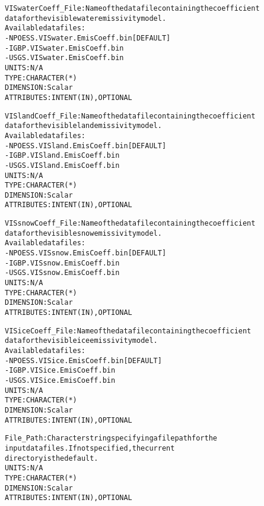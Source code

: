 \begin{alltt}
        VISwaterCoeff_File: Name of the data file containing the coefficient
                            data for the visible water emissivity model.
                            Available datafiles:
                            - NPOESS.VISwater.EmisCoeff.bin  [DEFAULT]
                            - IGBP.VISwater.EmisCoeff.bin
                            - USGS.VISwater.EmisCoeff.bin
                            UNITS:      N/A
                            TYPE:       CHARACTER(*)
                            DIMENSION:  Scalar
                            ATTRIBUTES: INTENT(IN), OPTIONAL
 
        VISlandCoeff_File:  Name of the data file containing the coefficient
                            data for the visible land emissivity model.
                            Available datafiles:
                            - NPOESS.VISland.EmisCoeff.bin  [DEFAULT]
                            - IGBP.VISland.EmisCoeff.bin
                            - USGS.VISland.EmisCoeff.bin
                            UNITS:      N/A
                            TYPE:       CHARACTER(*)
                            DIMENSION:  Scalar
                            ATTRIBUTES: INTENT(IN), OPTIONAL
 
        VISsnowCoeff_File:  Name of the data file containing the coefficient
                            data for the visible snow emissivity model.
                            Available datafiles:
                            - NPOESS.VISsnow.EmisCoeff.bin  [DEFAULT]
                            - IGBP.VISsnow.EmisCoeff.bin
                            - USGS.VISsnow.EmisCoeff.bin
                            UNITS:      N/A
                            TYPE:       CHARACTER(*)
                            DIMENSION:  Scalar
                            ATTRIBUTES: INTENT(IN), OPTIONAL
 
        VISiceCoeff_File:   Name of the data file containing the coefficient
                            data for the visible ice emissivity model.
                            Available datafiles:
                            - NPOESS.VISice.EmisCoeff.bin  [DEFAULT]
                            - IGBP.VISice.EmisCoeff.bin
                            - USGS.VISice.EmisCoeff.bin
                            UNITS:      N/A
                            TYPE:       CHARACTER(*)
                            DIMENSION:  Scalar
                            ATTRIBUTES: INTENT(IN), OPTIONAL
 
        File_Path:          Character string specifying a file path for the
                            input data files. If not specified, the current
                            directory is the default.
                            UNITS:      N/A
                            TYPE:       CHARACTER(*)
                            DIMENSION:  Scalar
                            ATTRIBUTES: INTENT(IN), OPTIONAL
 

\end{alltt}
